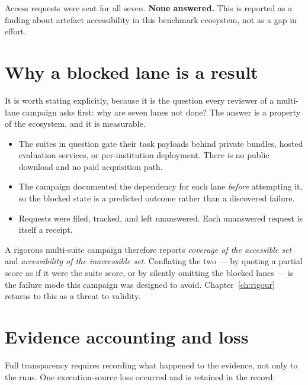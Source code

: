 Access requests were sent for all seven. \textbf{None answered.} This is reported
as a finding about artefact accessibility in this benchmark ecosystem, not as a
gap in effort.

\section{Why a blocked lane is a result}

It is worth stating explicitly, because it is the question every reviewer of a
multi-lane campaign asks first: why are seven lanes not done? The answer is a
property of the ecosystem, and it is measurable.

\begin{itemize}[leftmargin=1.4em,itemsep=2pt]
  \item The suites in question gate their task payloads behind private bundles,
  hosted evaluation services, or per-institution deployment. There is no public
  download and no paid acquisition path.
  \item The campaign documented the dependency for each lane \emph{before}
  attempting it, so the blocked state is a predicted outcome rather than a
  discovered failure.
  \item Requests were filed, tracked, and left unanswered. Each unanswered request
  is itself a receipt.
\end{itemize}

A rigorous multi-suite campaign therefore reports \emph{coverage of the
accessible set} and \emph{accessibility of the inaccessible set}. Conflating the
two --- by quoting a partial score as if it were the suite score, or by silently
omitting the blocked lanes --- is the failure mode this campaign was designed to
avoid. Chapter~\ref{ch:rigour} returns to this as a threat to validity.

\section{Evidence accounting and loss}

Full transparency requires recording what happened to the evidence, not only to
the runs. One execution-source loss occurred and is retained in the record:

